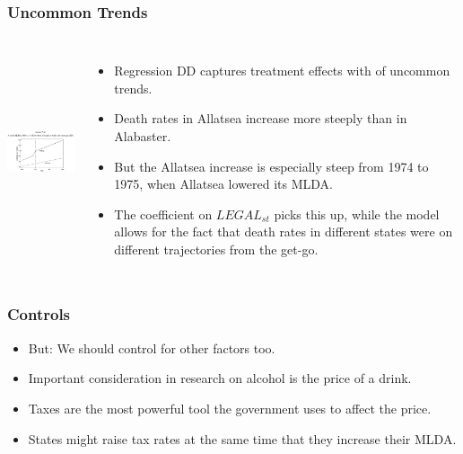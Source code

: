 \documentclass{beamer}
\begin{document}
\begin{frame}
\frametitle{Uncommon Trends}
	\begin{columns}
\includegraphics[width=5cm,height=6cm,keepaspectratio]{Figure 5.6} 

\begin{itemize}
	\item Regression DD captures treatment effects with of uncommon trends. 
	\item Death rates in Allatsea increase more steeply than in Alabaster.
	\item But the Allatsea increase is especially steep from 1974 to 1975, when Allatsea lowered its
MLDA. 
	\item The coefficient on $LEGAL_{st}$ picks this up, while the model allows for the fact that death rates in different states were on different trajectories from the get-go.
\end{itemize}

\end{columns}
\end{frame}


\begin{frame}
\frametitle{Controls}
	\begin{itemize}
		\item But: We should control for other factors too.
		\item Important consideration in research on alcohol is the price of a drink. 
	  \item Taxes are the most powerful tool the government uses to affect the price.
		\item States might raise tax rates at the same time that they increase their MLDA.

	\end{itemize}

\end{frame}
\end{document}
